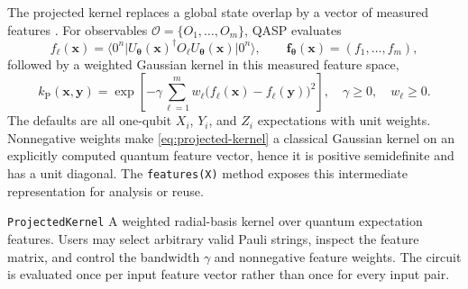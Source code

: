 \documentclass[10pt]{article}
\newcommand{\code}[1]{\texttt{#1}}
\begin{document}
The projected kernel replaces a global state overlap by a vector of measured
features \cite{huang2021power}.  For observables
$\mathcal O=\{O_1,\ldots,O_m\}$, QASP evaluates
\begin{equation}
  f_\ell(\bm{x})
  =\langle0^n\rvert U_{\bm\theta}(\bm{x})^\dagger O_\ell
    U_{\bm\theta}(\bm{x})\lvert0^n\rangle,
  \qquad
  \bm f_{\bm\theta}(\bm{x})=(f_1,\ldots,f_m),
  \label{eq:projected-quantum-features}
\end{equation}
followed by a weighted Gaussian kernel in this measured feature space,
\begin{equation}
  k_{\mathrm P}(\bm{x},\bm{y})
  =\exp\!\left[-\gamma\sum_{\ell=1}^{m}w_\ell
    \bigl(f_\ell(\bm{x})-f_\ell(\bm{y})\bigr)^2\right],
  \quad \gamma\geq0,\quad w_\ell\geq0.
  \label{eq:projected-kernel}
\end{equation}
The defaults are all one-qubit $X_i$, $Y_i$, and $Z_i$ expectations with
unit weights.  Nonnegative weights make
\cref{eq:projected-kernel} a classical Gaussian kernel on an explicitly
computed quantum feature vector, hence it is positive semidefinite and has a
unit diagonal.  The \code{features(X)} method exposes this intermediate
representation for analysis or reuse.

\begin{qaspfeature}{\code{ProjectedKernel}}
A weighted radial-basis kernel over quantum expectation features.  Users may
select arbitrary valid Pauli strings, inspect the feature matrix, and control
the bandwidth $\gamma$ and nonnegative feature weights.  The circuit is
evaluated once per input feature vector rather than once for every input pair.
\end{qaspfeature}
\end{document}
